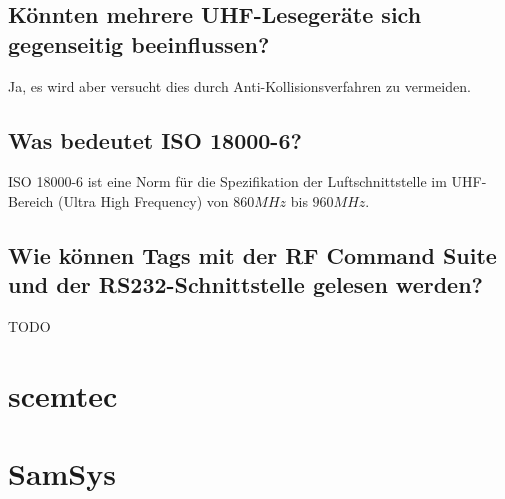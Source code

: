 \documentclass[paper=a4,fontsize=11pt,headsepline,footsepline,parskip=half]{scrartcl}
\begin{document}
\subsection{Könnten mehrere UHF-Lesegeräte sich gegenseitig beeinflussen?}

Ja, es wird aber versucht dies durch Anti-Kollisionsverfahren zu vermeiden.

\subsection{Was bedeutet ISO 18000-6?}

ISO 18000-6 ist eine Norm für die Spezifikation der Luftschnittstelle im UHF-Bereich (Ultra High Frequency) von $860 MHz$ bis $960 MHz$.

\subsection{Wie können Tags mit der RF Command Suite und der RS232-Schnittstelle gelesen werden?}

TODO

\section{scemtec}

\section{SamSys}
\end{document}
